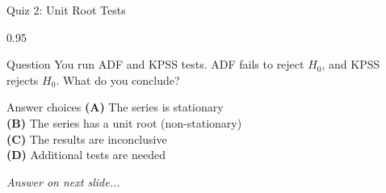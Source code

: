 \documentclass[9pt, aspectratio=169, t]{beamer}
\begin{document}
\begin{frame}{Quiz 2: Unit Root Tests}
    \begin{cminipage}{0.95\textwidth}
    \begin{alertblock}{Question}
        You run ADF and KPSS tests. ADF fails to reject $H_0$, and KPSS rejects $H_0$. What do you conclude?
    \end{alertblock}

    \vspace{0.4cm}

    \begin{block}{Answer choices}
        \textcolor{MainBlue}{\textbf{(A)}} The series is stationary\\[3pt]
        \textcolor{MainBlue}{\textbf{(B)}} The series has a unit root (non-stationary)\\[3pt]
        \textcolor{MainBlue}{\textbf{(C)}} The results are inconclusive\\[3pt]
        \textcolor{MainBlue}{\textbf{(D)}} Additional tests are needed
    \end{block}

    \vspace{0.5cm}

    \begin{center}
        \textit{Answer on next slide...}
    \end{center}
    \end{cminipage}
\end{frame}
\end{document}
